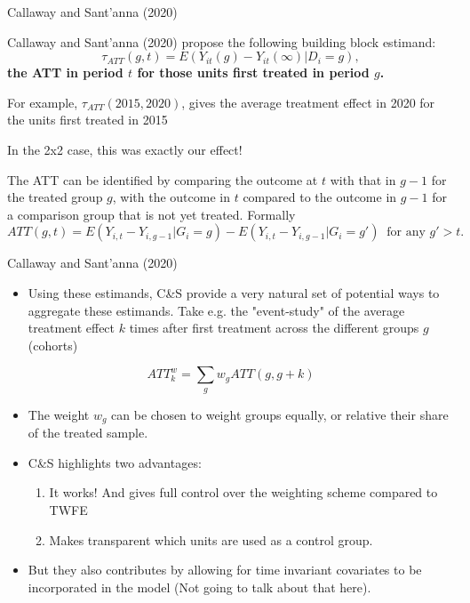 \documentclass[notes,11pt, aspectratio=169]{beamer}
\newenvironment{wideitemize}{\itemize\addtolength{\itemsep}{10pt}}{\enditemize}
\begin{document}
\begin{frame}{Callaway and Sant'anna (2020)} 
  \begin{wideitemize}
  \item Callaway and Sant'anna (2020) propose the following building block estimand:
    \begin{equation*}
      \tau_{ATT}(g,t) = E(Y_{it}(g) - Y_{it}(\infty) | D_{i} = g), 
    \end{equation*}
    \textbf{the ATT in period $t$ for those units first treated in period $g$.} 
    \item For example, $\tau_{ATT}(2015,2020)$, gives the average treatment effect in 2020 for the units first treated in 2015    
    \begin{wideitemize}
    \item In the 2x2 case, this was exactly our effect!
   \end{wideitemize}
       \item The ATT can be identified by comparing the outcome at $t$ with that in $g-1$ for the treated group $g$, with the outcome in $t$ compared to the outcome in $g-1$ for a comparison group that is not yet treated. Formally
    \begin{equation*}
        ATT(g,t)=E(Y_{i,t}-Y_{i,g-1}|G_i=g)-E(Y_{i,t}-Y_{i,g-1}|G_i=g')\;\; \text{for any }g'>t. 
    \end{equation*}
     \end{wideitemize}
    \end{frame}

\begin{frame}{Callaway and Sant'anna (2020)}
\begin{itemize}
  \item Using these estimands, C\&S provide a very natural set of potential ways to aggregate these estimands. Take e.g. the "event-study" of the average treatment effect $k$ times after first treatment across the different groups $g$ (cohorts)
\end{itemize}

\begin{equation}
    ATT^w_k=\sum_g w_g ATT(g,g+k)
\end{equation}

\begin{itemize}
    \item The weight $w_g$ can be chosen to weight groups equally, or relative their share of the treated sample. 
    \item C\&S highlights two advantages:
    \begin{enumerate}
        \item It works! And gives full control over the weighting scheme compared to TWFE
        \item Makes transparent which units are used as a control group.
    \end{enumerate}
    \item But they also contributes by allowing for time invariant covariates to be incorporated in the model (Not going to talk about that here).
\end{itemize}
\end{frame}
\end{document}
